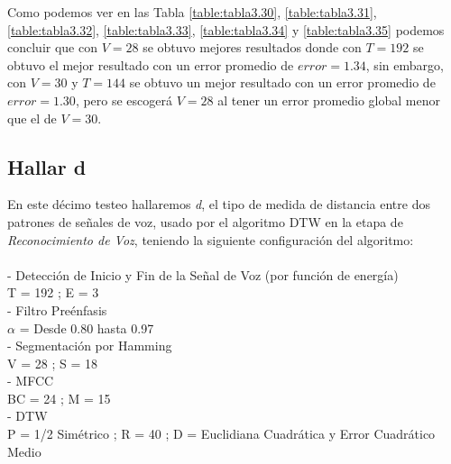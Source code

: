 \vskip -0.5cm
Como podemos ver en las Tabla \ref{table:tabla3.30}, \ref{table:tabla3.31}, \ref{table:tabla3.32}, \ref{table:tabla3.33}, \ref{table:tabla3.34} y \ref{table:tabla3.35} podemos concluir que con $V = 28$ se obtuvo mejores resultados donde con $T = 192$ se obtuvo el mejor resultado con un error promedio de $error = 1.34$, sin embargo, con $V = 30$ y $T = 144$ se obtuvo un mejor resultado con un error promedio de $error = 1.30$, pero se escogerá $V = 28$ al tener un error promedio global menor que el de $V = 30$.

\subsection{Hallar d}
En este décimo testeo hallaremos \textit{d}, el tipo de medida de distancia entre dos patrones de señales de voz, usado por el algoritmo DTW en la etapa de \textit{Reconocimiento de Voz}, teniendo la siguiente configuración del algoritmo:\\ \\
- Detección de Inicio y Fin de la Señal de Voz (por función de energía) \\
\hspace*{1cm} T = 192 ; \qquad E = 3 \\
- Filtro Preénfasis \\
\hspace*{1cm} $\alpha$ = Desde 0.80 hasta 0.97 \\
- Segmentación por Hamming \\
\hspace*{1cm} V = 28 ; \qquad S = 18 \\
- MFCC \\
\hspace*{1cm} BC = 24 ; \qquad M = 15 \\
- DTW \\
\hspace*{1cm} P = 1/2 Simétrico ;  \qquad R = 40 ; \qquad D = Euclidiana Cuadrática y Error Cuadrático Medio


